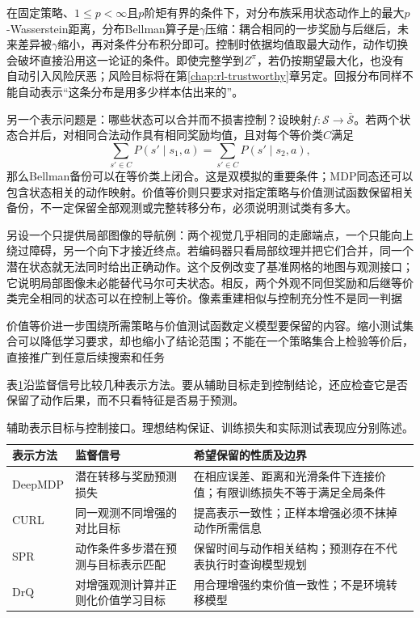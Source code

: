 在固定策略、$1\leq p<\infty$且$p$阶矩有界的条件下，对分布族采用状态动作上的最大$p$-Wasserstein距离，分布Bellman算子是$\gamma$压缩：耦合相同的一步奖励与后继后，未来差异被$\gamma$缩小，再对条件分布积分即可。控制时依据均值取最大动作，动作切换会破坏直接沿用这一论证的条件。即使完整学到$Z^\pi$，若仍按期望最大化，也没有自动引入风险厌恶；风险目标将在第\ref{chap:rl-trustworthy}章另定。回报分布同样不能自动表示“这条分布是用多少样本估出来的”。

另一个表示问题是：哪些状态可以合并而不损害控制？设映射$f:\mathcal S\to\bar{\mathcal S}$。若两个状态合并后，对相同合法动作具有相同奖励均值，且对每个等价类$C$满足
\[
  \sum_{s'\in C}P(s'\mid s_1,a)
       =\sum_{s'\in C}P(s'\mid s_2,a),
\]
那么Bellman备份可以在等价类上闭合。这是双模拟的重要条件；MDP同态还可以包含状态相关的动作映射。价值等价则只要求对指定策略与价值测试函数保留相关备份，不一定保留全部观测或完整转移分布，必须说明测试类有多大。

另设一个只提供局部图像的导航例：两个视觉几乎相同的走廊端点，一个只能向上绕过障碍，另一个向下才接近终点。若编码器只看局部纹理并把它们合并，同一个潜在状态就无法同时给出正确动作。这个反例改变了基准网格的地图与观测接口；它说明局部图像未必能替代马尔可夫状态。相反，两个外观不同但奖励和后继等价类完全相同的状态可以在控制上等价。像素重建相似与控制充分性不是同一判据

价值等价进一步围绕所需策略与价值测试函数定义模型要保留的内容。缩小测试集合可以降低学习要求，却也缩小了结论范围；不能在一个策略集合上检验等价后，直接推广到任意后续搜索和任务

表\ref{tab:rl-learning-representations}沿监督信号比较几种表示方法。要从辅助目标走到控制结论，还应检查它是否保留了动作后果，而不只看特征是否易于预测。

\begin{table}[t]
  \centering
  \small
  \begin{tabularx}{\linewidth}{>{\raggedright\arraybackslash}p{22mm} >{\raggedright\arraybackslash}X >{\raggedright\arraybackslash}X}
    \toprule
    表示方法 & 监督信号 & 希望保留的性质及边界 \\
    \midrule
    DeepMDP & 潜在转移与奖励预测损失 & 在相应误差、距离和光滑条件下连接价值；有限训练损失不等于满足全局条件 \\
    CURL & 同一观测不同增强的对比目标 & 提高表示一致性；正样本增强必须不抹掉动作所需信息 \\
    SPR & 动作条件多步潜在预测与目标表示匹配 & 保留时间与动作相关结构；预测存在不代表执行时查询模型规划 \\
    DrQ & 对增强观测计算并正则化价值学习目标 & 用合理增强约束价值一致性；不是环境转移模型 \\
    \bottomrule
  \end{tabularx}
  \caption{辅助表示目标与控制接口。理想结构保证、训练损失和实际测试表现应分别陈述。}
  \label{tab:rl-learning-representations}
\end{table}


